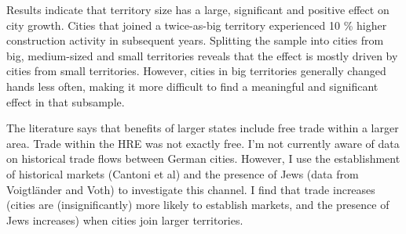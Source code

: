 \documentclass{article}
\begin{document}
Results indicate that territory size has a large, significant and positive effect on city growth. Cities that joined a twice-as-big territory experienced 10 \% higher construction activity in subsequent years. Splitting the sample into cities from big, medium-sized and small territories reveals that the effect is mostly driven by cities from small territories. However, cities in big territories generally changed hands less often, making it more difficult to find a meaningful and significant effect in that subsample.

The literature says that benefits of larger states include free trade within a larger area. Trade within the HRE was not exactly free. I'm not currently aware of data on historical trade flows between German cities. However, I use the establishment of historical markets (Cantoni et al) and the presence of Jews (data from Voigtl\"ander and Voth) to investigate this channel. I find that trade increases (cities are (insignificantly) more likely to establish markets, and the presence of Jews increases) when cities join larger territories.

\newpage


\end{document}
